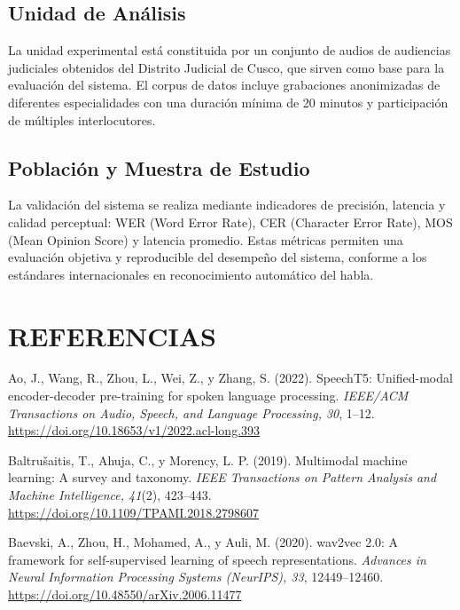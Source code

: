 \documentclass[12pt,a4paper,oneside]{report}
\begin{document}
\section{Unidad de Análisis}

La unidad experimental está constituida por un conjunto de audios de audiencias judiciales obtenidos del Distrito Judicial de Cusco, que sirven como base para la evaluación del sistema. El corpus de datos incluye grabaciones anonimizadas de diferentes especialidades con una duración mínima de 20 minutos y participación de múltiples interlocutores.

\section{Población y Muestra de Estudio}

La validación del sistema se realiza mediante indicadores de precisión, latencia y calidad perceptual: WER (Word Error Rate), CER (Character Error Rate), MOS (Mean Opinion Score) y latencia promedio. Estas métricas permiten una evaluación objetiva y reproducible del desempeño del sistema, conforme a los estándares internacionales en reconocimiento automático del habla.



\chapter*{REFERENCIAS}
\setlength{\parindent}{0pt}
\setlength{\hangindent}{1.25cm}

Ao, J., Wang, R., Zhou, L., Wei, Z., y Zhang, S. (2022). SpeechT5: Unified-modal encoder-decoder pre-training for spoken language processing. \textit{IEEE/ACM Transactions on Audio, Speech, and Language Processing, 30}, 1--12. \url{https://doi.org/10.18653/v1/2022.acl-long.393}

\vspace{6pt}
Baltrušaitis, T., Ahuja, C., y Morency, L. P. (2019). Multimodal machine learning: A survey and taxonomy. \textit{IEEE Transactions on Pattern Analysis and Machine Intelligence, 41}(2), 423--443. \url{https://doi.org/10.1109/TPAMI.2018.2798607}

\vspace{6pt}
Baevski, A., Zhou, H., Mohamed, A., y Auli, M. (2020). wav2vec 2.0: A framework for self-supervised learning of speech representations. \textit{Advances in Neural Information Processing Systems (NeurIPS), 33}, 12449--12460. \url{https://doi.org/10.48550/arXiv.2006.11477}
\end{document}
